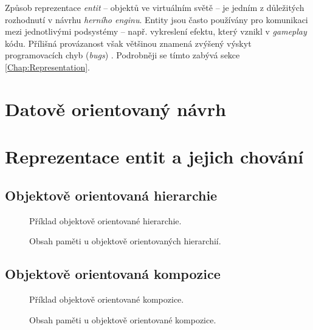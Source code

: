 Způsob reprezentace \emph{entit} -- objektů ve virtuálním světě -- je jedním z důležitých rozhodnutí v návrhu \emph{herního enginu}. Entity jsou často používány pro komunikaci mezi jednotlivými podsystémy -- např. vykreslení efektu, který vznikl v \emph{gameplay} kódu. Přílišná provázanost však většinou znamená zvýšený výskyt programovacích chyb (\emph{bugs}) \cite{GameDesignPatterns}. Podrobněji se tímto zabývá sekce \ref{Chap:Representation}.

\section{Datově orientovaný návrh}
\label{Chap:DDD}
\blind[4]

\section{Reprezentace entit a jejich chování}
\blind[2]

\subsection{Objektově orientovaná hierarchie}
\begin{figure}[H]
	\caption{Příklad objektově orientované hierarchie. }
\end{figure}
\begin{figure}[H]
	\caption{Obsah paměti u objektově orientovaných hierarchií. }
\end{figure}
\blind[3]

\subsection{Objektově orientovaná kompozice}
\begin{figure}[H]
	\caption{Příklad objektově orientované kompozice. }
\end{figure}
\begin{figure}[H]
	\caption{Obsah paměti u objektově orientované kompozice. }
\end{figure}
\blind[3]

